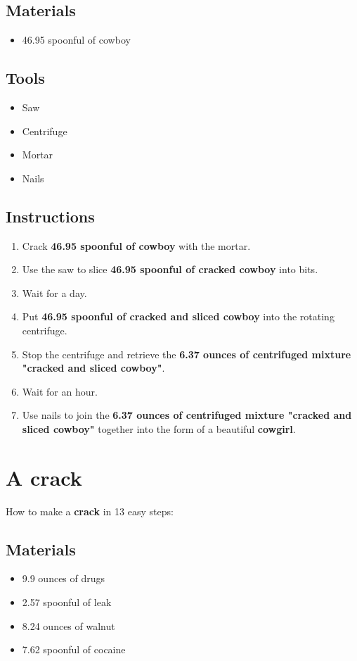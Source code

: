 \documentclass{article}
\begin{document}
\subsection{Materials}\begin{itemize}
\item 
46.95 spoonful of cowboy
\end{itemize}
\subsection{Tools}\begin{itemize}
\item 
Saw
\item 
Centrifuge
\item 
Mortar
\item 
Nails
\end{itemize}
\subsection{Instructions}\begin{enumerate}
\item 
Crack \textbf{46.95 spoonful of cowboy} with the mortar.
\item 
Use the saw to slice \textbf{46.95 spoonful of cracked cowboy} into bits.
\item 
Wait for a day.
\item 
Put \textbf{46.95 spoonful of cracked and sliced cowboy} into the rotating centrifuge.
\item 
Stop the centrifuge and retrieve the \textbf{6.37 ounces of centrifuged mixture "cracked and sliced cowboy"}.
\item 
Wait for an hour.
\item 
Use nails to join the \textbf{6.37 ounces of centrifuged mixture "cracked and sliced cowboy"} together into the form of a beautiful \textbf{cowgirl}.
\end{enumerate}
\newpage
\section{A crack}How to make a \textbf{crack} in 13 easy steps:

\subsection{Materials}\begin{itemize}
\item 
9.9 ounces of drugs
\item 
2.57 spoonful of leak
\item 
8.24 ounces of walnut
\item 
7.62 spoonful of cocaine
\end{itemize}
\end{document}
